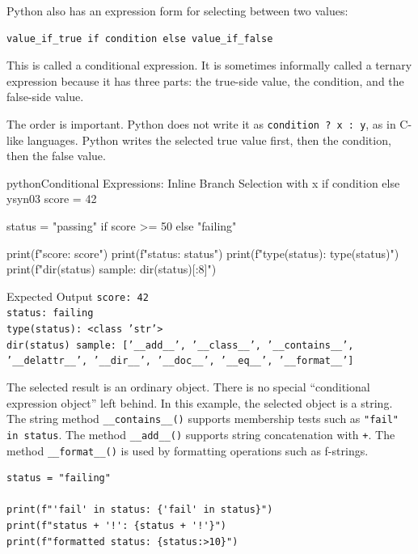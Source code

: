 \documentclass[a4paper,twoside]{report}
\begin{document}
Python also has an expression form for selecting between two values:

\begin{verbatim}
value_if_true if condition else value_if_false
\end{verbatim}

This is called a conditional expression. It is sometimes informally called a ternary expression because it has three parts: the true-side value, the condition, and the false-side value.

The order is important. Python does not write it as \texttt{condition ? x : y}, as in C-like languages. Python writes the selected true value first, then the condition, then the false value.

\begin{codebox}[]{python}{Conditional Expressions: Inline Branch Selection with x if condition else y}{syn03}
score = 42

status = "passing" if score >= 50 else "failing"

print(f"score: {score}")
print(f"status: {status}")
print(f"type(status): {type(status)}")
print(f"dir(status) sample: {dir(status)[:8]}")
\end{codebox}


\begin{iobox}{Expected Output}
\texttt{score: 42} \\
\texttt{status: failing} \\
\texttt{type(status): <class 'str'>} \\
\texttt{dir(status) sample: ['\_\_add\_\_', '\_\_class\_\_', '\_\_contains\_\_', '\_\_delattr\_\_', '\_\_dir\_\_', '\_\_doc\_\_', '\_\_eq\_\_', '\_\_format\_\_']} \\
\end{iobox}


The selected result is an ordinary object. There is no special ``conditional expression object'' left behind. In this example, the selected object is a string. The string method \texttt{\_\_contains\_\_()} supports membership tests such as \texttt{"fail" in status}. The method \texttt{\_\_add\_\_()} supports string concatenation with \texttt{+}. The method \texttt{\_\_format\_\_()} is used by formatting operations such as f-strings.

\begin{verbatim}
status = "failing"

print(f"'fail' in status: {'fail' in status}")
print(f"status + '!': {status + '!'}")
print(f"formatted status: {status:>10}")
\end{verbatim}
\end{document}
